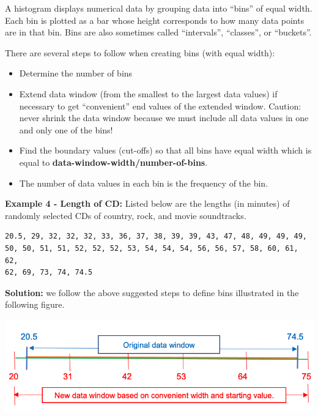 \documentclass[
]{book}
\begin{document}
A histogram displays numerical data by grouping data into ``bins'' of equal width. Each bin is plotted as a bar whose height corresponds to how many data points are in that bin. Bins are also sometimes called ``intervals'', ``classes'', or ``buckets''.

There are several steps to follow when creating bins (with equal width):

\begin{itemize}
\item
  Determine the number of bins
\item
  Extend data window (from the smallest to the largest data values) if necessary to get ``convenient'' end values of the extended window. Caution: never shrink the data window because we must include all data values in one and only one of the bins!
\item
  Find the boundary values (cut-offs) so that all bins have equal width which is equal to \textbf{data-window-width/number-of-bins}.
\item
  The number of data values in each bin is the frequency of the bin.
\end{itemize}

\textbf{Example 4 - Length of CD: } Listed below are the lengths (in minutes) of randomly selected CDs of country, rock, and movie soundtracks.

\begin{verbatim}
20.5, 29, 32, 32, 32, 33, 36, 37, 38, 39, 39, 43, 47, 48, 49, 49, 49, 
50, 50, 51, 51, 52, 52, 52, 53, 54, 54, 54, 56, 56, 57, 58, 60, 61, 62, 
62, 69, 73, 74, 74.5 
\end{verbatim}

\textbf{Solution: } we follow the above suggested steps to define bins illustrated in the following figure.

\begin{center}\includegraphics[width=0.8\linewidth]{week01/findingBins} \end{center}
\end{document}
